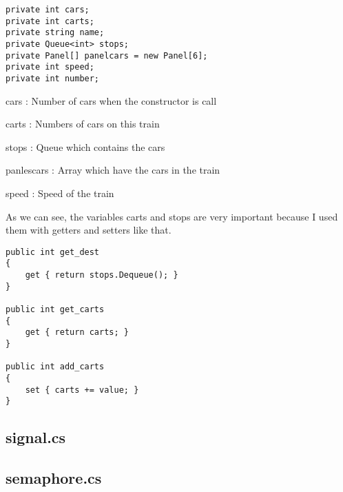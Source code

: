 \documentclass[12pt]{article}
\begin{document}
\begin{lstlisting}[frame=single]
private int cars;
private int carts;
private string name;
private Queue<int> stops;
private Panel[] panelcars = new Panel[6];
private int speed;
private int number;
\end{lstlisting}

\quad

cars		: Number of cars when the constructor is call

carts		: Numbers of cars on this train

stops		: Queue which contains the cars

panlescars  : Array which have the cars in the train

speed		: Speed of the train

\quad

As we can see, the variables carts and stops are very important because I used them with getters and setters like that.\\

\begin{lstlisting}[frame=single]
public int get_dest
{
	get { return stops.Dequeue(); }
}

public int get_carts
{
	get { return carts; }
}

public int add_carts
{
	set { carts += value; }
}
\end{lstlisting}

\subsection{signal.cs}

\subsection{semaphore.cs}
\end{document}

